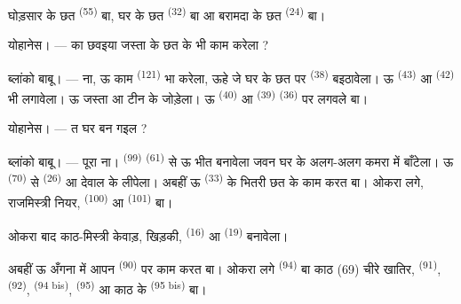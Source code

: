 
घोड़सार के छत  \textsuperscript{(55)} बा, घर के छत
 \textsuperscript{(32)} बा आ बरामदा के छत
 \textsuperscript{(24)} बा।

\textsc{योहानेस}। --- का छवइया जस्ता के छत के भी काम करेला ?

\textsc{ब्लांको बाबू}। --- ना, ऊ काम 
\textsuperscript{(121)} भा  करेला, ऊहे जे घर के छत पर
 \textsuperscript{(38)} बइठावेला। ऊ 
\textsuperscript{(43)} आ  \textsuperscript{(42)} भी
लगावेला। ऊ जस्ता आ टीन के जोड़ेला। ऊ 
\textsuperscript{(40)} आ  \textsuperscript{(39)}
 \textsuperscript{(36)} पर लगवले बा।

\textsc{योहानेस}। --- त घर बन गइल ?

\VUsaut{3.0mm}
\VUsaut{3.0mm}

\textsc{ब्लांको बाबू}। --- पूरा ना। 
\textsuperscript{(99)}  \textsuperscript{(61)} से ऊ भीत
बनावेला जवन घर के अलग-अलग कमरा में बाँटेला। ऊ 
\textsuperscript{(70)} से  \textsuperscript{(26)} आ
देवाल के लीपेला। अबहीं ऊ  \textsuperscript{(33)} के भितरी
छत के काम करत बा। ओकरा लगे, राजमिस्त्री नियर, 
\textsuperscript{(100)} आ  \textsuperscript{(101)} बा।

ओकरा बाद काठ-मिस्त्री केवाड़, खिड़की, 
\textsuperscript{(16)} आ  \textsuperscript{(19)} बनावेला।

अबहीं ऊ अँगना में आपन  \textsuperscript{(90)} पर काम
करत बा। ओकरा लगे  \textsuperscript{(94)} बा काठ (69) चीरे खातिर,
 \textsuperscript{(91)},  \textsuperscript{(92)},
 \textsuperscript{(94 bis)},  \textsuperscript{(95)}
आ काठ के  \textsuperscript{(95 bis)} बा।

